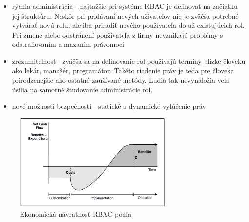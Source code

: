 \begin{itemize}
	\item rýchla administrácia - najťažšie pri systéme RBAC je definovať na začiatku jej štruktúru. Neskôr pri pridávaní nových užívateľov nie je zväčša potrebné vytvárať novú rolu, ale iba priradiť nového používateľa do už existujúcich rol. Pri zmene alebo odstránení používateľa z firmy nevznikajú problémy s odstraňovaním a mazaním právomocí
	\item zrozumiteľnosť - zväčša sa na definovanie rol používajú termíny blízke človeku ako lekár, manažér, programátor. Takéto riadenie práv je teda pre človeka prirodzenejšie ako ostatné zaužívané metódy. Ľudia tak nevynaložia veľa úsilia na samotné študovanie administrácie rol. 
	\item nové možnosti bezpečnosti - statické a dynamické vylúčenie práv
\end{itemize} 




	

\begin{figure}[h]
	\centerline{\includegraphics[width=0.7\textwidth]{images/rbac_net_cash}}
	\caption{Ekonomická návratnosť RBAC podľa \cite{ekonomika}}
	\label{obr:rbac_net_cash}
\end{figure}












	


